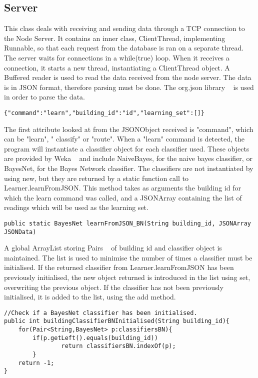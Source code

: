 \subsection{Server}
This class deals with receiving and sending data through a TCP connection to the Node Server. 
It contains an inner class, ClientThread, implementing Runnable, so that each request from the database is ran on a separate thread. The server waits for connections in a while(true) loop. When it receives a connection, it starts a new thread, instantiating a ClientThread object. A Buffered reader is used to read the data received from the node server. The data is in JSON format, therefore parsing must be done. The org.json library ~\cite{org.json} is used in order to parse the data. 
\begin{lstlisting} 
{"command":"learn","building_id":"id","learning_set":[]}
\end{lstlisting}
The first attribute looked at from the JSONObject received is "command", which can be  "learn", " classify" or "route". 
When a "learn" command is detected, the program will instantiate a classifier object for each classifier used. These objects are provided by Weka ~\cite{Weka} and include NaiveBayes, for the naive bayes classifier, or BayesNet, for the Bayes Network classifier. 
The classifiers are not instantiated by using new, but they are returned by a static function call to Learner.learnFromJSON. This method takes as arguments the building id for which the learn command was called, and a JSONArray containing the list of readings which will be used as the learning set. 
\begin{lstlisting} 
public static BayesNet learnFromJSON_BN(String building_id, JSONArray JSONData)
\end{lstlisting}
A global ArrayList storing Pairs ~\cite{tuple} of building id and classifier object is maintained. The list is used to minimise the number of times a classifier must be initialised. If the returned classifier from Learner.learnFromJSON has been previously initialised, the new object returned is introduced in the list using set, overwriting the previous object. If the classifier has not been previously initialised, it is added to the list, using the add method. 
\begin{lstlisting}
//Check if a BayesNet classifier has been initialised.	
public int buildingClassifierBNInitialised(String building_id){
	for(Pair<String,BayesNet> p:classifiersBN){
		if(p.getLeft().equals(building_id))
        		return classifiersBN.indexOf(p);
        }
    return -1;
}    
\end{lstlisting}

